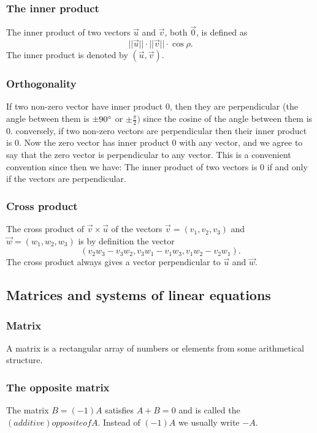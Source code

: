 \documentclass{article}
\begin{document}
			\subsubsection{The inner product}
			The inner product of two vectors $\vec{u}$ and $\vec{v}$, both $\vec{0}$, is defined as
			\begin{equation*}
				||\vec{u}|| \cdot ||\vec{v}|| \cdot \cos{\rho}.
			\end{equation*}
			The inner product is denoted by $(\vec{u}, \vec{v})$.
			
		\subsubsection{Orthogonality}
		If two non-zero vector have inner product 0, then they are perpendicular (the angle between them is $\pm 90\degree$ or $\pm\frac{\pi}{2})$ since the cosine of the angle between them is 0. conversely, if two non-zero vectors are perpendicular then their inner product is 0. Now the zero vector has inner product 0 with any vector, and we agree to say that the zero vector is perpendicular to any vector. This is a convenient convention since then we have: The inner product of two vectors is 0 if and only if the vectors are perpendicular.
		
		\subsubsection{Cross product}
		The cross product of $\vec{v}\times\vec{u}$ of the vectors $\vec{v} = (v_1, v_2, v_3)$ and $\vec{w} = (w_1, w_2, w_3)$ is by definition the vector
		\begin{equation*}
			(v_2w_3 - v_3w_2, v_3w_1 - v_1w_3, v_1w_2 - v_2w_1).
		\end{equation*}
		The cross product always gives a vector perpendicular to $\vec{u}$ and $\vec{w}$.
		
		\subsection{Matrices and systems of linear equations}
			\subsubsection{Matrix}
			A matrix is a rectangular array of numbers or elements from some arithmetical structure.
			
			\subsubsection{The opposite matrix}
			The matrix $B = (-1)A$ satisfies $A+B=0$ and is called the $(additive) opposite of A$. Instead of $(-1)A$ we usually write $-A$.
			
\end{document}
